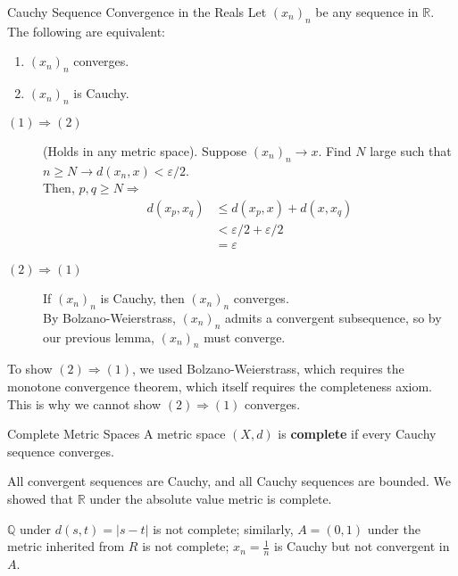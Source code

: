\documentclass[8pt]{extarticle}
\newcommand{\Q}{\mathbb{Q}}
\newcommand{\R}{\mathbb{R}}
\begin{document}
  \begin{problem}{Cauchy Sequence Convergence in the Reals}
    Let $(x_n)_n$ be any sequence in $\R$. The following are equivalent:
    \begin{enumerate}[(1)]
      \item $(x_n)_n$ converges.
      \item $(x_n)_n$ is Cauchy.
    \end{enumerate}
    \tcblower
    \begin{description}
      \item[$(1) \Rightarrow (2)$] (Holds in any metric space). Suppose $(x_n)_n \rightarrow x$. Find $N$ large such that $n\geq N \rightarrow d(x_n,x) < \varepsilon/2$.\\

        Then, $p,q\geq N \Rightarrow$
        \begin{align*}
          d(x_p,x_q) &\leq d(x_p,x) + d(x,x_q)\\
                     &< \varepsilon/2 + \varepsilon/2\\
                     &= \varepsilon
        \end{align*}
      \item[$(2)\Rightarrow(1)$] If $(x_n)_n$ is Cauchy, then $(x_n)_n$ converges.\\

        By Bolzano-Weierstrass, $(x_n)_n$ admits a convergent subsequence, so by our previous lemma, $(x_n)_n$ must converge.
    \end{description}
    \begin{description}
      \small
      \item[Note:] To show $(2) \Rightarrow (1)$, we used Bolzano-Weierstrass, which requires the monotone convergence theorem, which itself requires the completeness axiom. This is why we cannot show $(2) \Rightarrow (1)$ converges.
    \end{description}
  \end{problem}
  \begin{problem}{Complete Metric Spaces}
    A metric space $(X,d)$ is \textbf{complete} if every Cauchy sequence converges.
    \begin{description}
      \small
      \item[Remark:] All convergent sequences are Cauchy, and all Cauchy sequences are bounded. We showed that $\R$ under the absolute value metric is complete.
    \end{description}
    $\Q$ under $d(s,t) = |s-t|$ is not complete; similarly, $A = (0,1)$ under the metric inherited from $R$ is not complete; $x_n = \frac{1}{n}$ is Cauchy but not convergent in $A$.
  \end{problem}
\end{document}
